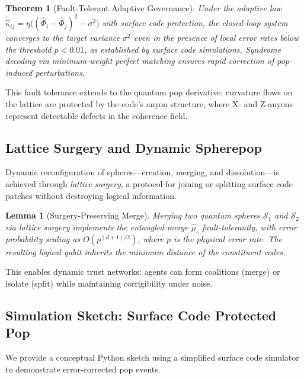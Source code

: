 \documentclass[12pt]{article}
\newtheorem{lemma}{Lemma}
\newtheorem{theorem}{Theorem}
\begin{document}
\begin{theorem}[Fault-Tolerant Adaptive Governance]
Under the adaptive law \(\dot{\hat{\kappa}}_{ij} = \eta \big( (\hat{\Phi}_i - \hat{\Phi}_j)^2 - \sigma^2 \big)\) with surface code protection, the closed-loop system converges to the target variance \(\sigma^2\) even in the presence of local error rates below the threshold \(p < 0.01\), as established by surface code simulations. Syndrome decoding via minimum-weight perfect matching ensures rapid correction of pop-induced perturbations.
\end{theorem}

This fault tolerance extends to the quantum pop derivative: curvature flows on the lattice are protected by the code's anyon structure, where X- and Z-anyons represent detectable defects in the coherence field.

\subsection{Lattice Surgery and Dynamic Spherepop}
Dynamic reconfiguration of spheres—creation, merging, and dissolution—is achieved through \emph{lattice surgery}, a protocol for joining or splitting surface code patches without destroying logical information.

\begin{lemma}[Surgery-Preserving Merge]
Merging two quantum spheres \(\mathcal{S}_1\) and \(\mathcal{S}_2\) via lattice surgery implements the entangled merge \(\hat{\mu}_{\circ}\) fault-tolerantly, with error probability scaling as \(O(p^{(d+1)/2})\), where \(p\) is the physical error rate. The resulting logical qubit inherits the minimum distance of the constituent codes.
\end{lemma}

This enables dynamic trust networks: agents can form coalitions (merge) or isolate (split) while maintaining corrigibility under noise.

\subsection{Simulation Sketch: Surface Code Protected Pop}
We provide a conceptual Python sketch using a simplified surface code simulator to demonstrate error-corrected pop events.
\end{document}
